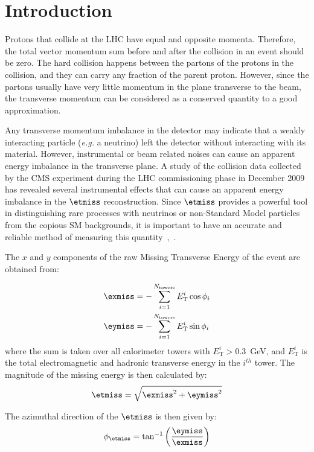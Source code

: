 \section{Introduction}
Protons that collide at the LHC have equal and
opposite momenta. Therefore, the total vector momentum sum before and
after the collision in an event
should be zero. The hard collision happens between the partons of the
protons in the collision, and they can carry any fraction of the parent
proton. However, since the partons usually have very
little momentum in the plane transverse to the beam, the transverse
momentum can be considered as a conserved quantity to a good
approximation. 

Any transverse momentum imbalance in the detector may indicate that a
weakly interacting particle (\textit{e.g.} a neutrino) left the
detector without interacting with its material. However, instrumental or
beam related noises can cause an apparent energy imbalance in the
transverse plane. A study of the collision data collected by the CMS
experiment during the LHC commissioning phase in December 2009 has
revealed several instrumental effects that can cause an apparent energy
imbalance in the $\etmiss$ reconstruction. Since $\etmiss$ provides a powerful
tool in distinguishing rare processes with neutrinos or non-Standard
Model particles from the copious SM backgrounds, it is important to have an accurate and reliable method
of measuring this quantity~\cite{CMS:AN_2007_041},~\cite{CMS:AN_2008_089}. 

The $x$ and $y$ components of the raw Missing Transverse Energy of the
event are obtained from:

\begin{align}
  \label{eq:32}
  \exmiss&=-\sum^{N_\text{towers}}_{i=1}E_\text{T}^i\cos\phi_i\\
  \label{eq:33}
  \eymiss&=-\sum^{N_\text{towers}}_{i=1}E_\text{T}^i\sin\phi_i
\end{align}
where the sum is taken over all calorimeter towers with $E_\text{T}^i>0.3$~GeV, 
and $E_\text{T}^i$ is the total electromagnetic and hadronic transverse energy 
in the $i^{th}$ tower. The magnitude of the missing energy is then calculated
by:
\begin{equation}
  \etmiss=\sqrt{\exmiss^2+\eymiss^2}
\end{equation}

The azimuthal direction of the $\etmiss$ is then given by:
\begin{equation}
  \phi_{\etmiss}=\tan^{-1}\left(\frac{\eymiss}{\exmiss}\right)
\end{equation}

